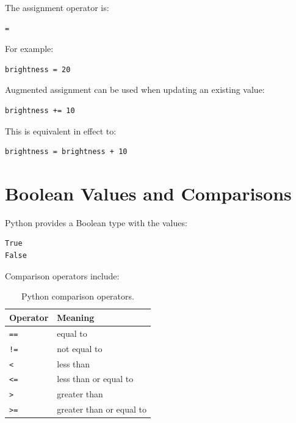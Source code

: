 The assignment operator is:

\begin{verbatim}
=
\end{verbatim}

For example:

\begin{verbatim}
brightness = 20
\end{verbatim}

Augmented assignment can be used when updating an existing value:

\begin{verbatim}
brightness += 10
\end{verbatim}

This is equivalent in effect to:

\begin{verbatim}
brightness = brightness + 10
\end{verbatim}


\section{Boolean Values and Comparisons}
\label{sec:python-booleans}

Python provides a Boolean type with the values:

\begin{verbatim}
True
False
\end{verbatim}

Comparison operators include:

\begin{table}[htbp]
    \centering

    \caption{Python comparison operators.}
    \label{tab:python-comparisons}

    \begin{tabular}{@{}ll@{}}
        \toprule
        \textbf{Operator} & \textbf{Meaning} \\
        \midrule

        \texttt{==} & equal to \\
        \texttt{!=} & not equal to \\
        \texttt{<}  & less than \\
        \texttt{<=} & less than or equal to \\
        \texttt{>}  & greater than \\
        \texttt{>=} & greater than or equal to \\

        \bottomrule
    \end{tabular}
\end{table}

